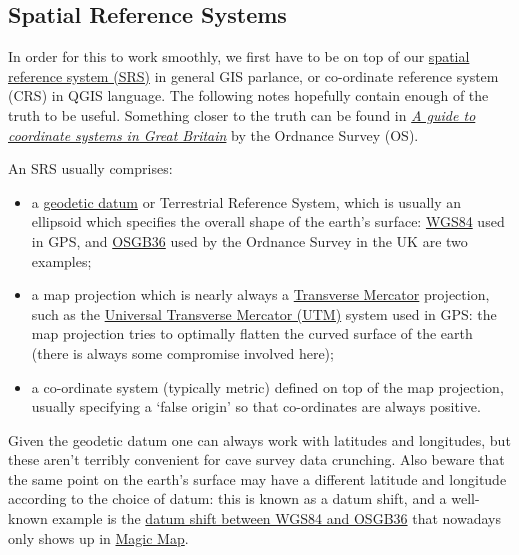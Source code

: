 \documentclass[]{article}
\begin{document}
\subsection{Spatial Reference Systems}\label{spatial-reference-systems}

In order for this to work smoothly, we first have to be on top of our
\href{https://en.wikipedia.org/wiki/Spatial_reference_system}{spatial
reference system (SRS)} in general GIS parlance, or co-ordinate
reference system (CRS) in QGIS language. The following notes hopefully
contain enough of the truth to be useful. Something closer to the truth
can be found in
\href{https://www.ordnancesurvey.co.uk/docs/support/guide-coordinate-systems-great-britain.pdf}{{\it A guide to coordinate systems in 
Great Britain}} by the Ordnance Survey (OS).

An SRS usually comprises:

\begin{itemize}
\item
  a \href{https://en.wikipedia.org/wiki/Geodetic_datum}{geodetic
    datum} or Terrestrial Reference System, which is usually an
  ellipsoid which specifies the overall shape of the earth's surface:
  \href{https://en.wikipedia.org/wiki/World_Geodetic_System}{WGS84}
  used in GPS, and 
  \href{https://en.wikipedia.org/wiki/Ordnance_Survey_National_Grid}{OSGB36}
  used by the Ordnance Survey in the UK are two examples;
\item
  a map projection which is nearly always a
  \href{https://en.wikipedia.org/wiki/Transverse_Mercator_projection}{Transverse
  Mercator} projection, such as the
  \href{https://en.wikipedia.org/wiki/Universal_Transverse_Mercator_coordinate_system}{Universal
  Transverse Mercator (UTM)} system used in GPS: the map projection
  tries to optimally flatten the curved surface of the earth (there is
  always some compromise involved here);
\item
  a co-ordinate system (typically metric) defined on top of the map
  projection, usually specifying a `false origin' so that
  co-ordinates are always positive.
\end{itemize}

Given the geodetic datum one can always work with latitudes and
longitudes, but these aren't terribly convenient for cave survey data
crunching. Also beware that the same point on the earth's surface may
have a different latitude and longitude according to the choice of
datum: this is known as a datum shift, and a well-known example is the
\href{https://en.wikipedia.org/wiki/Ordnance_Survey_National_Grid\#Datum_shift_between_OSGB_36_and_WGS_84}{datum
  shift between WGS84 and OSGB36} that nowadays only shows up in
\href{http://www.natureonthemap.naturalengland.org.uk/MagicMap.aspx}{Magic
  Map}.
\end{document}
